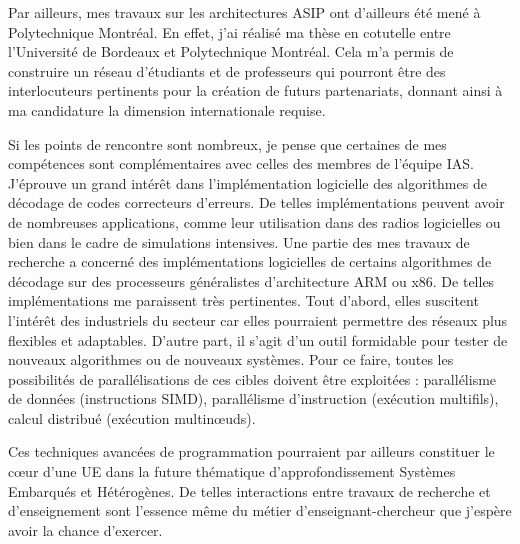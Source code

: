 Par ailleurs, mes travaux sur les architectures ASIP ont d'ailleurs été mené à Polytechnique Montréal. En effet, j'ai réalisé ma thèse en cotutelle entre l'Université de Bordeaux et Polytechnique Montréal. Cela m'a permis de construire un réseau d'étudiants et de professeurs qui pourront être des interlocuteurs pertinents pour la création de futurs partenariats, donnant ainsi à ma candidature la dimension internationale requise.

Si les points de rencontre sont nombreux, je pense que certaines de mes compétences sont complémentaires avec celles des membres de l'équipe IAS. J'éprouve un grand intérêt dans l'implémentation logicielle des algorithmes de décodage de codes correcteurs d'erreurs. De telles implémentations peuvent avoir de nombreuses applications, comme leur utilisation dans des radios logicielles ou bien dans le cadre de simulations intensives. Une partie des mes travaux de recherche a concerné des implémentations logicielles de certains algorithmes de décodage sur des processeurs généralistes d'architecture ARM ou x86. De telles implémentations me paraissent très pertinentes. Tout d'abord, elles suscitent l'intérêt des industriels du secteur car elles pourraient permettre des réseaux plus flexibles et adaptables. D'autre part, il s'agit d'un outil formidable pour tester de nouveaux algorithmes ou de nouveaux systèmes. Pour ce faire, toutes les possibilités de parallélisations de ces cibles doivent être exploitées : parallélisme de données (instructions SIMD), parallélisme d'instruction (exécution multifils), calcul distribué (exécution multin\oe{}uds).

Ces techniques avancées de programmation pourraient par ailleurs constituer le c\oe{}ur d'une UE dans la future thématique d'approfondissement Systèmes Embarqués et Hétérogènes. De telles interactions entre travaux de recherche et d'enseignement sont l'essence même du métier d'enseignant-chercheur que j'espère avoir la chance d'exercer.
